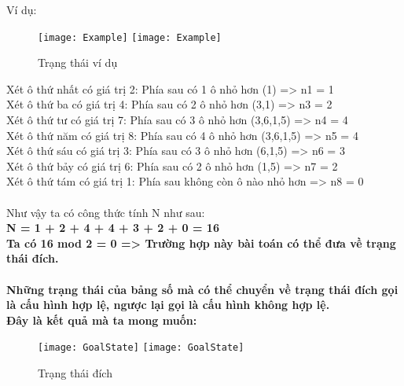Ví dụ:
\begin{figure}[!htbp]
  \begin{center}
    \leavevmode
    \ifpdf
      \texttt{[image: Example]}
    \else
      \texttt{[image: Example]}
    \fi
    \caption{Trạng thái ví dụ}
    \label{FigAir}
  \end{center}
\end{figure}
Xét ô thứ nhất có giá trị 2: Phía sau có 1 ô nhỏ hơn (1) => n1 = 1\\
Xét ô thứ ba có giá trị 4: Phía sau có 2 ô nhỏ hơn (3,1) => n3 = 2\\
Xét ô thứ tư có giá trị 7: Phía sau có 3 ô nhỏ hơn (3,6,1,5) => n4 = 4\\
Xét ô thứ năm có giá trị 8: Phía sau có 4 ô nhỏ hơn (3,6,1,5) => n5 = 4\\
Xét ô thứ sáu có giá trị 3: Phía sau có 3 ô nhỏ hơn (6,1,5) => n6 = 3\\
Xét ô thứ bảy có giá trị 6: Phía sau có 2 ô nhỏ hơn (1,5) => n7 = 2\\
Xét ô thứ tám có giá trị 1: Phía sau không còn ô nào nhỏ hơn => n8 = 0\\\\
Như vậy ta có công thức tính N như sau: \\
\bfseries N = 1 + 2 + 4 + 4 + 3 + 2 + 0 = 16\\
\mdseries Ta có 16 mod 2 = 0 => Trường hợp này bài toán có thể đưa về trạng thái đích.\\
\\
Những trạng thái của bảng số mà có thể chuyển về trạng thái đích gọi là cấu hình hợp lệ, ngược lại gọi là cấu hình không hợp lệ.\\
Đây là kết quả mà ta mong muốn:\\
\begin{figure}[!htbp]
  \begin{center}
    \leavevmode
    \ifpdf
      \texttt{[image: GoalState]}
    \else
      \texttt{[image: GoalState]}
    \fi
    \caption{Trạng thái đích}
    \label{FigAir}
  \end{center}
\end{figure}











